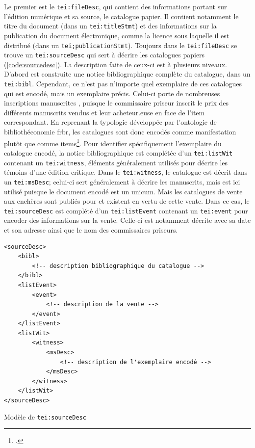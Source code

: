 Le premier est le \texttt{tei:fileDesc}, qui contient des informations portant sur l'édition numérique et sa source, le catalogue papier. Il contient notamment le titre du document (dans un \texttt{tei:titleStmt}) et des informations sur la publication du document électronique, comme la licence sous laquelle il est distribué (dans un \texttt{tei;publicationStmt}). Toujours dans le \texttt{tei:fileDesc} se trouve un \texttt{tei:sourceDesc} qui sert à décrire les catalogues papiers (\ref{code:sourcedesc}). La description faite de ceux-ci est à plusieurs niveaux. D'abord est construite une notice bibliographique complète du catalogue, dans un \texttt{tei:bibl}. Cependant, ce n'est pas n'importe quel exemplaire de ces catalogues qui est encodé, mais un exemplaire précis. Celui-ci porte de nombreuses inscriptions manuscrites , puisque le commissaire priseur inscrit le prix des différents manuscrits vendus et leur acheteur.euse en face de l'item correspondant. En reprenant la typologie développée par l'ontologie de bibliothéconomie \gls{frbr}, les catalogues sont donc encodés comme manifestation plutôt que comme items\footcite[p. 28]{rondeau_du_noyer_encoder_2019}. Pour identifier spécifiquement l'exemplaire du catalogue encodé, la notice bibliographique est complétée d'un \texttt{tei:listWit} contenant un \texttt{tei:witness}, éléments généralement utilisés pour décrire les témoins d'une édition critique. Dans le \texttt{tei:witness}, le catalogue est décrit dans un \texttt{tei:msDesc}; celui-ci sert généralement à décrire les manuscrits, mais est ici utilisé puisque le document encodé est un unicum. Mais les catalogues de vente aux enchères sont publiés pour et existent en vertu de cette vente. Dans ce cas, le \texttt{tei:sourceDesc} est complété d'un \texttt{tei:listEvent} contenant un \texttt{tei:event} pour encoder des informations sur la vente. Celle-ci est notamment décrite avec sa date et son adresse ainsi que le nom des commissaires priseurs.
	
\begin{listing}[h]
	\begin{verbatim}
<sourceDesc>
	<bibl>
		<!-- description bibliographique du catalogue -->
	</bibl>
	<listEvent>
		<event>
			<!-- description de la vente -->
		</event>
	</listEvent>
	<listWit>
		<witness>
			<msDesc>
				<!-- description de l'exemplaire encodé -->
			</msDesc>
		</witness>
	</listWit>
</sourceDesc>
	\end{verbatim}
	\caption{Modèle de \texttt{tei:sourceDesc}}
	\label{code:sourcedesc}
\end{listing}
	
